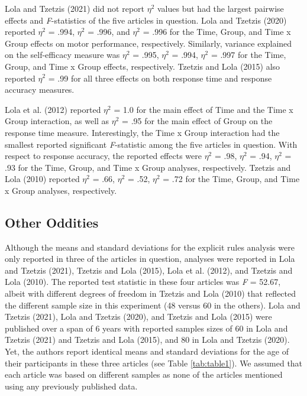 \documentclass[
  english,
  man, donotrepeattitle,floatsintext]{apa7}
\begin{document}
Lola and Tzetzis (2021) did not report \(\eta^{2}\) values but had the largest pairwise effects and \emph{F}-statistics of the five articles in question. Lola and Tzetzis (2020) reported \(\eta^{2}\) = .994, \(\eta^{2}\) = .996, and \(\eta^{2}\) = .996 for the Time, Group, and Time x Group effects on motor performance, respectively. Similarly, variance explained on the self-efficacy measure was \(\eta^{2}\) = .995, \(\eta^{2}\) = .994, \(\eta^{2}\) = .997 for the Time, Group, and Time x Group effects, respectively. Tzetzis and Lola (2015) also reported \(\eta^{2}\) = .99 for all three effects on both response time and response accuracy measures.

Lola et al. (2012) reported \(\eta^{2}\) = 1.0 for the main effect of Time and the Time x Group interaction, as well as \(\eta^{2}\) = .95 for the main effect of Group on the response time measure. Interestingly, the Time x Group interaction had the smallest reported significant \emph{F}-statistic among the five articles in question. With respect to response accuracy, the reported effects were \(\eta^{2}\) = .98, \(\eta^{2}\) = .94, \(\eta^{2}\) = .93 for the Time, Group, and Time x Group analyses, respectively. Tzetzis and Lola (2010) reported \(\eta^{2}\) = .66, \(\eta^{2}\) = .52, \(\eta^{2}\) = .72 for the Time, Group, and Time x Group analyses, respectively.

\hypertarget{other-oddities}{%
\subsection{Other Oddities}\label{other-oddities}}

Although the means and standard deviations for the explicit rules analysis were only reported in three of the articles in question, analyses were reported in Lola and Tzetzis (2021), Tzetzis and Lola (2015), Lola et al. (2012), and Tzetzis and Lola (2010). The reported test statistic in these four articles was \emph{F} = 52.67, albeit with different degrees of freedom in Tzetzis and Lola (2010) that reflected the different sample size in this experiment (48 versus 60 in the others). Lola and Tzetzis (2021), Lola and Tzetzis (2020), and Tzetzis and Lola (2015) were published over a span of 6 years with reported samples sizes of 60 in Lola and Tzetzis (2021) and Tzetzis and Lola (2015), and 80 in Lola and Tzetzis (2020). Yet, the authors report identical means and standard deviations for the age of their participants in these three articles (see Table \ref{tab:table1}). We assumed that each article was based on different samples as none of the articles mentioned using any previously published data.
\end{document}
